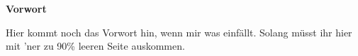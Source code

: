 \cleardoublepage
\thispagestyle{scrplain}

\vphantom{\Huge A}
\begin{flushright}\normalfont\sffamily\Huge\bfseries Vorwort\end{flushright}
\vspace{1cm}
Hier kommt noch das Vorwort hin, wenn mir was einf\"allt. Solang m\"usst ihr hier mit 'ner zu 90\% leeren Seite auskommen.